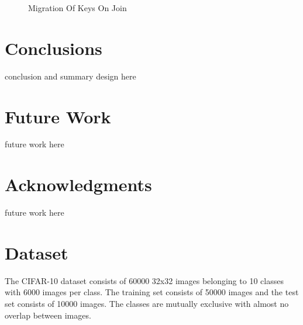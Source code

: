 \documentclass[10pt,twocolumn,letterpaper]{article}
\begin{document}
\begin{figure}[ht]
\caption{Migration Of Keys On Join}
\label{fig:conhashing}
\end{figure}





\section{Conclusions} \label{conclusions}
conclusion and summary design here

\section{Future Work} \label{futurework}
future work here

\section{Acknowledgments} \label{acknowledgments}
future work here

\section{Dataset}
The CIFAR-10 dataset \cite{krizhevsky2009learning} consists of 60000 32x32 images belonging to 10 classes with 6000 images per class.	The training set consists of 50000 images and the test set consists of 10000 images. The classes are mutually exclusive with almost no overlap between images.
\end{document}
